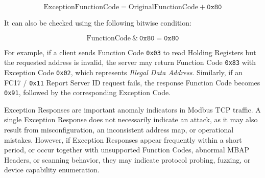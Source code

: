 $$
\mathrm{ExceptionFunctionCode} = \mathrm{OriginalFunctionCode} + \texttt{0x80}
$$

It can also be checked using the following bitwise condition:

$$
\mathrm{FunctionCode} \ \&\ \texttt{0x80} = \texttt{0x80}
$$

For example, if a client sends Function Code \texttt{0x03} to read Holding
Registers but the requested address is invalid, the server may return
Function Code \texttt{0x83} with Exception Code \texttt{0x02}, which
represents \emph{Illegal Data Address}. Similarly, if an FC17 /
\texttt{0x11} Report Server ID request fails, the response Function Code
becomes \texttt{0x91}, followed by the corresponding Exception Code.

Exception Responses are important anomaly indicators in Modbus TCP traffic. A single Exception Response does not necessarily indicate an attack, as it may also result from misconfiguration, an inconsistent address map, or operational mistakes. However, if Exception Responses appear frequently within a short period, or occur together with unsupported Function Codes, abnormal MBAP Headers, or scanning behavior, they may indicate protocol probing, fuzzing, or device capability enumeration.

